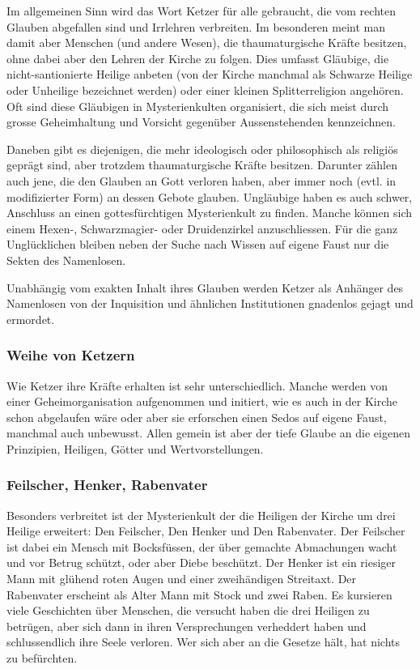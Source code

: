 \documentclass[10pt,twoside,twocolumn,openany]{book}
\begin{document}
\begin{multicols}{2}
	Im allgemeinen Sinn wird das Wort Ketzer für alle gebraucht, die vom rechten Glauben abgefallen sind und Irrlehren verbreiten. Im besonderen meint man damit aber Menschen (und andere Wesen), die thaumaturgische Kräfte besitzen, ohne dabei aber den Lehren der Kirche zu folgen. Dies umfasst Gläubige, die nicht-santionierte Heilige anbeten (von der Kirche manchmal als Schwarze Heilige oder Unheilige bezeichnet werden) oder einer kleinen Splitterreligion angehören. Oft sind diese Gläubigen in Mysterienkulten organisiert, die sich meist durch grosse Geheimhaltung und Vorsicht gegenüber Aussenstehenden kennzeichnen.
	
	Daneben gibt es diejenigen, die mehr ideologisch oder philosophisch als religiös geprägt sind, aber trotzdem thaumaturgische Kräfte besitzen. Darunter zählen auch jene, die den Glauben an Gott verloren haben, aber immer noch (evtl. in modifizierter Form) an dessen Gebote glauben. Ungläubige haben es auch schwer, Anschluss an einen gottesfürchtigen Mysterienkult zu finden. Manche können sich einem Hexen-, Schwarzmagier- oder Druidenzirkel anzuschliessen. Für die ganz Unglücklichen bleiben neben der Suche nach Wissen auf eigene Faust nur die Sekten des Namenlosen.
	
	Unabhängig vom exakten Inhalt ihres Glauben werden Ketzer als Anhänger des Namenlosen von der Inquisition und ähnlichen Institutionen gnadenlos gejagt und ermordet.
	
	\subsubsection{Weihe von Ketzern}
	Wie Ketzer ihre Kräfte erhalten ist sehr unterschiedlich. Manche werden von einer Geheimorganisation aufgenommen und initiert, wie es auch in der Kirche schon abgelaufen wäre oder aber sie erforschen einen Sedos auf eigene Faust, manchmal auch unbewusst. Allen gemein ist aber der tiefe Glaube an die eigenen Prinzipien, Heiligen, Götter und Wertvorstellungen.

	\subsubsection{Feilscher, Henker, Rabenvater}
	Besonders verbreitet ist der Mysterienkult der die Heiligen der Kirche um drei Heilige erweitert: Den Feilscher, Den Henker und Den Rabenvater.
	Der Feilscher ist dabei ein Mensch mit Bocksfüssen, der über gemachte Abmachungen wacht und vor Betrug schützt, oder aber Diebe beschützt. Der Henker ist ein riesiger Mann mit glühend roten Augen und einer zweihändigen Streitaxt. Der Rabenvater erscheint als Alter Mann mit Stock und zwei Raben. Es kursieren viele Geschichten über Menschen, die versucht haben die drei Heiligen zu betrügen, aber sich dann in ihren Versprechungen verheddert haben und schlussendlich ihre Seele verloren. Wer sich aber an die Gesetze hält, hat nichts zu befürchten.
	

\end{multicols}
\end{document}
